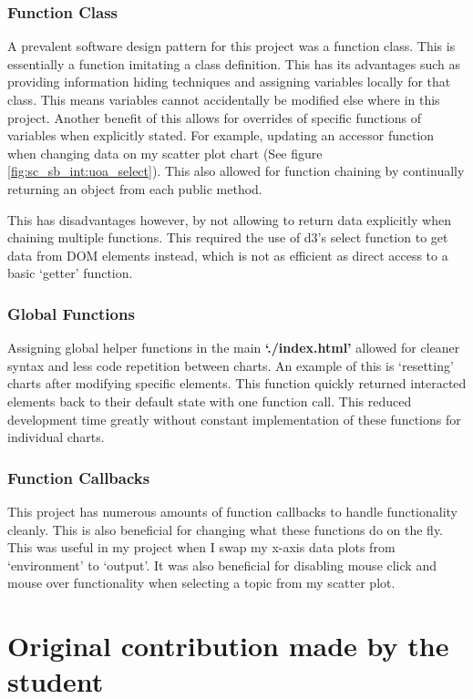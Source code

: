 \documentclass[a4paper, 11pt]{article}
\begin{document}
\subsubsection{Function Class}
A prevalent software design pattern for this project was a function class. This is essentially a function imitating a class definition. This has its advantages such as providing information hiding techniques and assigning variables locally for that class. This means variables cannot accidentally be modified else where in this project. Another benefit of this allows for overrides of specific functions of variables when explicitly stated. For example, updating an accessor function when changing data on my scatter plot chart (See figure \ref{fig:sc_sb_int:uoa_select}). This also allowed for function chaining by continually returning an object from each public method.

This has disadvantages however, by not allowing to return data explicitly when chaining multiple functions. This required the use of d3's select function to get data from DOM elements instead, which is not as efficient as direct access to a basic `getter' function.

\subsubsection{Global Functions}
Assigning global helper functions in the main \textbf{`./index.html'} allowed for cleaner syntax and less code repetition between charts. An example of this is `resetting' charts after modifying specific elements. This function quickly returned interacted elements back to their default state with one function call. This reduced development time greatly without constant implementation of these functions for individual charts.

\subsubsection{Function Callbacks}
This project has numerous amounts of function callbacks to handle functionality cleanly. This is also beneficial for changing what these functions do on the fly. This was useful in my project when I swap my x-axis data plots from `environment' to `output'. It was also beneficial for disabling mouse click and mouse over functionality when selecting a topic from my scatter plot.



\newpage
\section{Original contribution made by the student}
\end{document}
